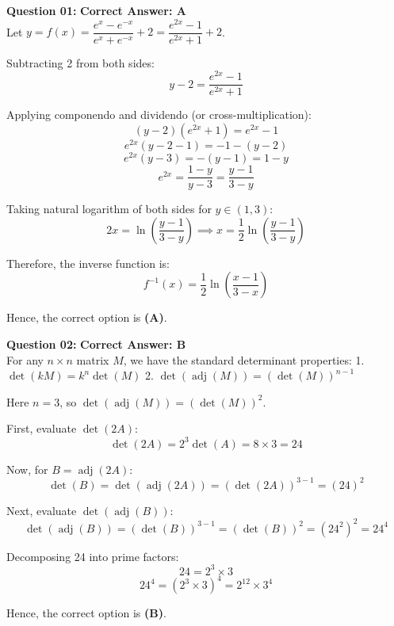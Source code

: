 \documentclass[11pt,a4paper]{article}
\begin{document}
\begin{tcolorbox}[solbox]
\textbf{\textcolor{primaryDark}{Question 01:}} \hfill \textbf{\textcolor{l1Green}{Correct Answer: A}}\\
\vspace{4pt}
Let $y = f(x) = \dfrac{e^x - e^{-x}}{e^x + e^{-x}} + 2 = \dfrac{e^{2x} - 1}{e^{2x} + 1} + 2$.

Subtracting 2 from both sides:
$$y - 2 = \frac{e^{2x} - 1}{e^{2x} + 1}$$

Applying componendo and dividendo (or cross-multiplication):
$$(y - 2)(e^{2x} + 1) = e^{2x} - 1$$
$$e^{2x}(y - 2 - 1) = -1 - (y - 2)$$
$$e^{2x}(y - 3) = -(y - 1) = 1 - y$$
$$e^{2x} = \frac{1 - y}{y - 3} = \frac{y - 1}{3 - y}$$

Taking natural logarithm of both sides for $y \in (1, 3)$:
$$2x = \ln\left(\frac{y - 1}{3 - y}\right) \implies x = \frac{1}{2}\ln\left(\frac{y - 1}{3 - y}\right)$$

Therefore, the inverse function is:
$$f^{-1}(x) = \frac{1}{2}\ln\left(\frac{x - 1}{3 - x}\right)$$

Hence, the correct option is \textbf{(A)}.
\end{tcolorbox}

\begin{tcolorbox}[solbox]
\textbf{\textcolor{primaryDark}{Question 02:}} \hfill \textbf{\textcolor{l1Green}{Correct Answer: B}}\\
\vspace{4pt}
For any $n \times n$ matrix $M$, we have the standard determinant properties:
1. $\det(kM) = k^n \det(M)$
2. $\det(\operatorname{adj}(M)) = (\det(M))^{n-1}$

Here $n = 3$, so $\det(\operatorname{adj}(M)) = (\det(M))^2$.

First, evaluate $\det(2A)$:
$$\det(2A) = 2^3 \det(A) = 8 \times 3 = 24$$

Now, for $B = \operatorname{adj}(2A)$:
$$\det(B) = \det(\operatorname{adj}(2A)) = (\det(2A))^{3-1} = (24)^2$$

Next, evaluate $\det(\operatorname{adj}(B))$:
$$\det(\operatorname{adj}(B)) = (\det(B))^{3-1} = (\det(B))^2 = \left(24^2\right)^2 = 24^4$$

Decomposing 24 into prime factors:
$$24 = 2^3 \times 3$$
$$24^4 = (2^3 \times 3)^4 = 2^{12} \times 3^4$$

Hence, the correct option is \textbf{(B)}.
\end{tcolorbox}
\end{document}
